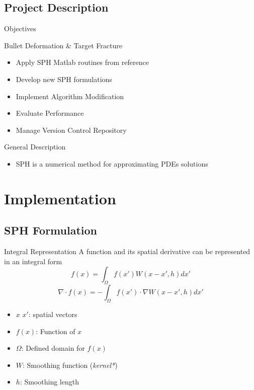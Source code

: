 \documentclass[10pt]{beamer}
\begin{document}
\subsection{Project Description}
\begin{frame}{Objectives}
\begin{Large}
\begin{center}
   Bullet Deformation \& Target Fracture
\end{center}
\end{Large}
   \begin{itemize}
   \item Apply SPH Matlab routines from reference
   \item Develop new SPH formulations
   \item Implement Algorithm Modification
   \item Evaluate Performance
   \item Manage Version Control Repository
   \end{itemize}
\end{frame}
\begin{frame}{General Description}
\begin{itemize}
\item SPH is a numerical method for approximating PDEs solutions
\end{itemize}
\end{frame}

\section{Implementation}

\subsection{SPH Formulation}

\begin{frame}{Integral Representation}
A function and its spatial derivative can be represented in an integral form
$$f(x)=\int_{\Omega}{f(x')W(x-x',h)dx'}$$
$$\nabla\cdot f(x)=-\int_{\Omega}{f(x')\cdot\nabla W(x-x',h)dx'}$$
\begin{itemize}
\item $x$ $x'$: spatial vectors
\item $f(x)$: Function of $x$
\item $\Omega$: Defined domain for $f(x)$
\item $W$: Smoothing function (\textit{kernel*})
\item $h$: Smoothing length
\end{itemize}
\end{frame}
\end{document}

